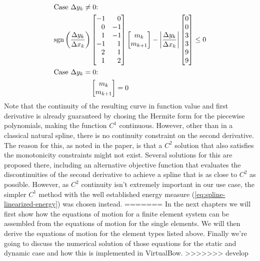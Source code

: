 \begin{align}
\intertext{Case $\Delta y_{k} \neq 0$:}
\operatorname*{sgn}\left(\frac{\Delta y_k}{\Delta x_k}\right)
&\begin{bmatrix}
-1 & \ \ 0 \\
\ \ 0 & -1 \\
\ \ 1 & -1 \\
-1 & \ \ 1 \\
\ \ 2 & \ \ 1 \\
\ \ 1 & \ \ 2
\end{bmatrix}
\begin{bmatrix}
m_{k} \\
m_{k+1}
\end{bmatrix}
-
\bigg| \frac{\Delta y_k}{\Delta x_k} \bigg|
\begin{bmatrix}
0 \\
0 \\
3 \\
3 \\
9 \\
9
\end{bmatrix}
\le 0 \\
\intertext{Case $\Delta y_{k} = 0$:}
&\begin{bmatrix}
m_{k} \\m_{k+1}
\end{bmatrix}
= 0
\end{align}
%
Note that the continuity of the resulting curve in function value and first derivative is already guaranteed by chosing the Hermite form for the piecewise polynomials, making the function $C^1$ continuous.
However, other than in a classical natural spline, there is no continuity constraint on the second derivative.
The reason for this, as noted in the paper, is that a $C^2$ solution that also satisfies the monotonicity constraints might not exist.
Several solutions for this are proposed there, including an alternative objective function that evaluates the discontinuities of the second derivative to achieve a spline that is as close to $C^2$ as possible.
However, as $C^2$ continuity isn't extremely important in our use case, the simpler $C^1$ method with the well established energy measure (\ref{eq:spline-linearized-energy}) was chosen instead.
=======
In the next chapters we will first show how the equations of motion for a finite element system can be assembled from the equations of motion for the single elements. We will then derive the equations of motion for the element types listed above. Finally we're going to discuss the numerical solution of those equations for the static and dynamic case and how this is implemented in VirtualBow.
>>>>>>> develop
